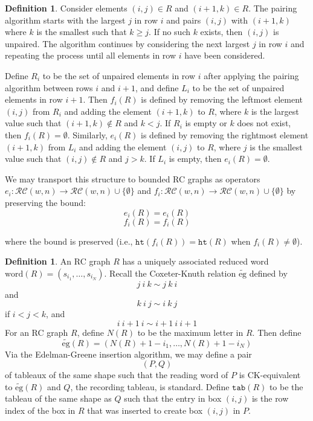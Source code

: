 \documentclass{amsart}
\theoremstyle{definition}
\newtheorem{definition}[lemma]{Definition}
\theoremstyle{remark}
\numberwithin{equation}{subsection}
\newcommand{\hr}{\mathtt{ht}}
\begin{document}
\begin{definition}
Consider elements $(i, j)\in R$ and $(i+1, k)\in R$. The pairing algorithm starts with the largest $j$ in row $i$ and pairs $(i, j)$ with $(i+1, k)$ where $k$ is the smallest such that $k \geq j$. If no such $k$ exists, then $(i, j)$ is unpaired. The algorithm continues by considering the next largest $j$ in row $i$ and repeating the process until all elements in row $i$ have been considered.

Define $R_i$ to be the set of unpaired elements in row $i$ after applying the pairing algorithm between rows $i$ and $i+1$, and define $L_i$ to be the set of unpaired elements in row $i+1$. Then $f_i(R)$ is defined by removing the leftmost element $(i, j)$ from $R_i$ and adding the element $(i + 1, k)$ to $R$, where $k$ is the largest value such that $(i+1,k)\notin R$ and $k < j$. If $R_i$ is empty or $k$ does not exist, then $f_i(R) = \emptyset$. Similarly, $e_i(R)$ is defined by removing the rightmost element $(i + 1, k)$ from $L_i$ and adding the element $(i, j)$ to $R$, where $j$ is the smallest value such that $(i,j)\notin R$ and $j > k$. If $L_i$ is empty, then $e_i(R) = \emptyset$.
\end{definition}

We may transport this structure to bounded RC graphs as  operators $e_i:\mathcal{RC}(w,n)\to\mathcal{RC}(w,n)\cup\{\emptyset\}$ and $f_i:\mathcal{RC}(w,n)\to\mathcal{RC}(w,n)\cup\{\emptyset\}$ by preserving the bound:
$$e_i(R) = e_i(R)$$
$$f_i(R)=f_i(R)$$

where the bound is preserved (i.e., $\hr(f_i(R)) = \hr(R)$ when $f_i(R)\neq\emptyset$).



\newcommand{\ckeq}{\sim}
\newcommand{\ege}{\widetilde{\mathrm{eg}}}
\begin{definition}
An RC graph $R$ has a uniquely associated reduced word $\mathrm{word}(R)=(s_{i_1},\ldots,s_{i_N})$. Recall the Coxeter-Knuth relation $\ege$ defined by
$$j\ i\ k \ckeq j\ k\ i$$
and
$$k\ i\ j \ckeq i\ k\ j$$
if $i<j<k$, and
$$i\ i+1\ i \ckeq i+1\ i\ i+1$$
For an RC graph $R$, define $N(R)$ to be the maximum letter in $R$. Then define
$$\ege(R) = (N(R) + 1 - i_1, \ldots, N(R) + 1 - i_N)$$
Via the Edelman-Greene insertion algorithm, we may define a pair
$$(P, Q)$$
of tableaux of the same shape such that the reading word of $P$ is CK-equivalent to $\ege(R)$ and $Q$, the recording tableau, is standard. Define $\mathtt{tab}(R)$ to be the tableau of the same shape as $Q$ such that the entry in box $(i, j)$ is the row index of the box in $R$ that was inserted to create box $(i, j)$ in $P$.
\end{definition}
\end{document}
